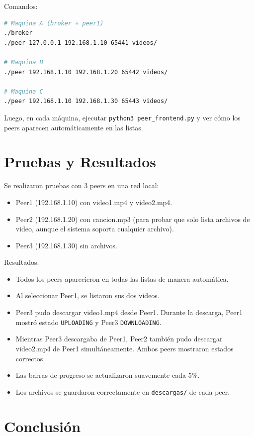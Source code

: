 \documentclass[12pt]{article}
\begin{document}
Comandos:
\begin{lstlisting}[language=bash]
# Maquina A (broker + peer1)
./broker
./peer 127.0.0.1 192.168.1.10 65441 videos/

# Maquina B
./peer 192.168.1.10 192.168.1.20 65442 videos/

# Maquina C
./peer 192.168.1.10 192.168.1.30 65443 videos/
\end{lstlisting}

Luego, en cada máquina, ejecutar \texttt{python3 peer\_frontend.py} y ver cómo los peers aparecen automáticamente en las listas.

\section{Pruebas y Resultados}

Se realizaron pruebas con 3 peers en una red local:
\begin{itemize}
    \item Peer1 (192.168.1.10) con video1.mp4 y video2.mp4.
    \item Peer2 (192.168.1.20) con cancion.mp3 (para probar que solo lista archivos de video, aunque el sistema soporta cualquier archivo).
    \item Peer3 (192.168.1.30) sin archivos.
\end{itemize}

Resultados:
\begin{itemize}
    \item Todos los peers aparecieron en todas las listas de manera automática.
    \item Al seleccionar Peer1, se listaron sus dos videos.
    \item Peer3 pudo descargar video1.mp4 desde Peer1. Durante la descarga, Peer1 mostró estado \texttt{UPLOADING} y Peer3 \texttt{DOWNLOADING}.
    \item Mientras Peer3 descargaba de Peer1, Peer2 también pudo descargar video2.mp4 de Peer1 simultáneamente. Ambos peers mostraron estados correctos.
    \item Las barras de progreso se actualizaron suavemente cada 5\%.
    \item Los archivos se guardaron correctamente en \texttt{descargas/} de cada peer.
\end{itemize}

\section{Conclusión}
\end{document}
